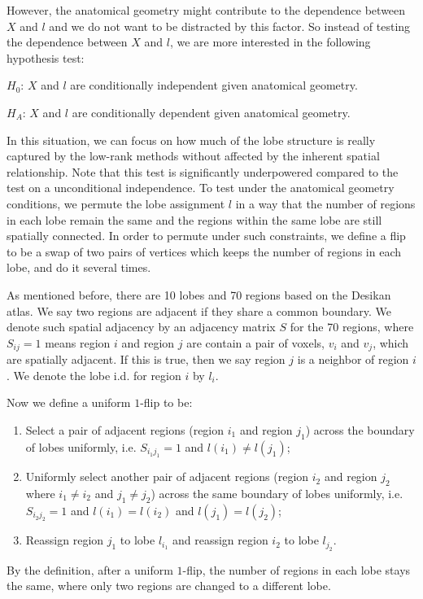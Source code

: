 However, the anatomical geometry might contribute to the dependence between $X$ and $l$ and we do not want to be distracted by this factor. So instead of testing the dependence between $X$ and $l$, we are more interested in the following hypothesis test:

$H_0$: $X$ and $l$ are conditionally independent given anatomical geometry.

$H_A$: $X$ and $l$ are conditionally dependent given anatomical geometry.

In this situation, we can focus on how much of the lobe structure is really captured by the low-rank methods without affected by the inherent spatial relationship. Note that this test is significantly underpowered compared to the test on a unconditional independence.
To test under the anatomical geometry conditions, we permute the lobe assignment $l$ in a way that the number of regions in each lobe remain the same and the regions within the same lobe are still spatially connected. In order to permute under such constraints, we define a flip to be a swap of two pairs of vertices which keeps the number of regions in each lobe, and do it several times.

As mentioned before, there are 10 lobes and 70 regions based on the Desikan atlas. 
We say two regions are adjacent if they share a common boundary. We denote such spatial adjacency by an adjacency matrix $S$ for the 70 regions, where $S_{ij} = 1$ means region $i$ and region $j$ are contain a pair of voxels, $v_i$ and $v_j$, which are spatially adjacent.
If this is true, then we say region $j$ is a neighbor of region $i$.
We denote the lobe i.d. for region $i$ by $l_i$.

Now we define a uniform $1$-flip to be:
\begin{enumerate}
\item Select a pair of adjacent regions (region $i_1$ and region $j_1$) across the boundary of lobes uniformly, i.e. $S_{i_1 j_1} = 1$ and $l(i_1) \ne l(j_1)$;
\item Uniformly select another pair of adjacent regions (region $i_2$ and region $j_2$ where $i_1 \ne i_2$ and $j_1 \ne j_2$) across the same boundary of lobes uniformly, i.e. $S_{i_2 j_2} = 1$ and $l(i_1) = l(i_2)$ and $l(j_1) = l(j_2)$;
\item Reassign region $j_1$ to lobe $l_{i_1}$ and reassign region $i_2$ to lobe $l_{j_2}$.
\end{enumerate}

By the definition, after a uniform $1$-flip, the number of regions in each lobe stays the same, where only two regions are changed to a different lobe.

